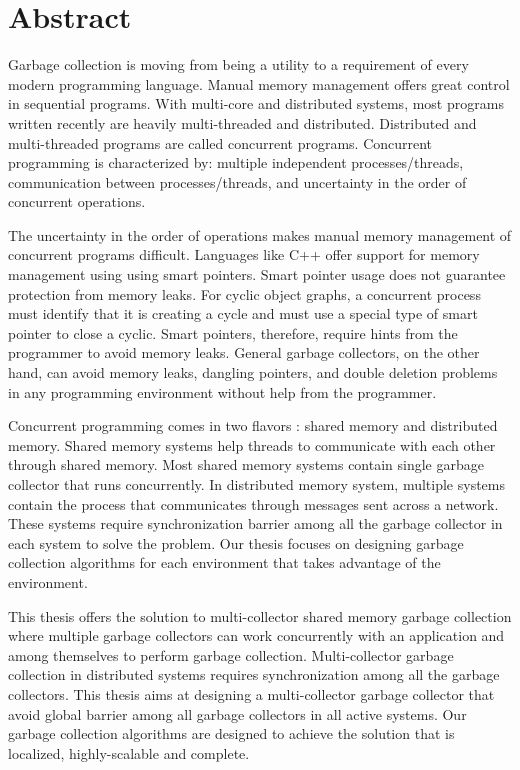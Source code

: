 \chapter*{Abstract}
\label{ch:abstract}
Garbage collection is moving from being a utility to a requirement of every modern programming language. Manual memory management offers great control in sequential programs. With multi-core and distributed systems, most programs written recently are heavily multi-threaded and distributed. Distributed and multi-threaded programs are called concurrent programs. Concurrent programming is characterized by: multiple independent processes/threads, communication between processes/threads, and uncertainty in the order of concurrent operations.

The uncertainty in the order of operations makes manual memory management of concurrent programs difficult. Languages like C++ offer support for memory management using using smart pointers. Smart pointer usage does not guarantee protection from memory leaks. For cyclic object graphs, a concurrent process must identify that it is creating a cycle and must use a special type of smart pointer to close a cyclic. Smart pointers, therefore, require hints from the programmer to avoid memory leaks. General garbage collectors, on the other hand, can avoid memory leaks, dangling pointers, and double deletion problems in any programming environment without help from the programmer. 

Concurrent programming comes in two flavors : shared memory and distributed memory. Shared memory systems help threads to communicate with each other through shared memory. Most shared memory systems contain single garbage collector that runs concurrently. In distributed memory system, multiple systems contain the process that communicates through messages sent across a network. These systems require synchronization barrier among all the garbage collector in each system to solve the problem. Our thesis focuses on designing garbage collection algorithms for each environment that takes advantage of the environment. 

This thesis offers the solution to multi-collector shared memory garbage collection where multiple garbage collectors can work concurrently with an application and among themselves to perform garbage collection. Multi-collector garbage collection in distributed systems requires synchronization among all the garbage collectors. This thesis aims at designing a multi-collector garbage collector that avoid global barrier among all garbage collectors in all active systems. Our garbage collection algorithms are designed to achieve the solution that is localized, highly-scalable and complete.
